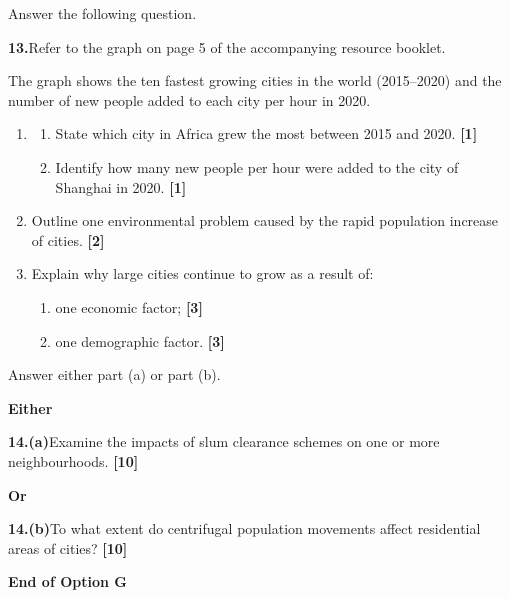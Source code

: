 \documentclass[11pt,a4paper]{article}
\newcommand{\markpts}[1]{\hfill\textbf{[#1]}}
\begin{document}
Answer the following question.

\textbf{13.}\quad Refer to the graph on page 5 of the accompanying resource
booklet.

The graph shows the ten fastest growing cities in the world (2015--2020) and
the number of new people added to each city per hour in 2020.

\begin{enumerate}[label=(\alph*),leftmargin=2.2em]
  \item
  \begin{enumerate}[label=(\roman*),leftmargin=2.8em]
    \item State which city in Africa grew the most between 2015 and 2020.
    \markpts{1}

    \item Identify how many new people per hour were added to the city of
    Shanghai in 2020. \markpts{1}
  \end{enumerate}

  \item Outline one environmental problem caused by the rapid population
  increase of cities. \markpts{2}

  \item Explain why large cities continue to grow as a result of:
  \begin{enumerate}[label=(\roman*),leftmargin=2.8em]
    \item one economic factor; \markpts{3}

    \item one demographic factor. \markpts{3}
  \end{enumerate}
\end{enumerate}

Answer either part (a) or part (b).

\textbf{Either}

\textbf{14.}\quad \textbf{(a)}\quad Examine the impacts of slum clearance
schemes on one or more neighbourhoods. \markpts{10}

\textbf{Or}

\textbf{14.}\quad \textbf{(b)}\quad To what extent do centrifugal population
movements affect residential areas of cities? \markpts{10}

\vfill

\begin{center}
  {\sffamily\bfseries\Large End of Option G}
\end{center}
\end{document}
